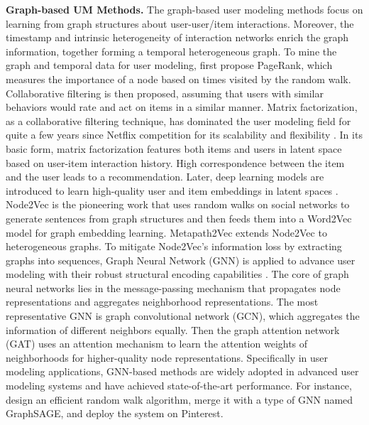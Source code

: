 \documentclass[11pt]{article}
\renewcommand\paragraph[1]{\vspace{0.05in} \noindent \textbf{#1.}}
\begin{document}
\paragraph{Graph-based UM Methods} The graph-based user modeling methods focus on learning from graph structures about user-user/item interactions. Moreover, the timestamp and intrinsic heterogeneity of interaction networks enrich the graph information, together forming a temporal heterogeneous graph. To mine the graph and temporal data for user modeling, \citet{page1998pagerank} first propose PageRank, which measures the importance of a node based on times visited by the random walk. Collaborative filtering \cite{schafer2007collaborative} is then proposed, assuming that users with similar behaviors would rate and act on items in a similar manner. Matrix factorization, as a collaborative filtering technique, has dominated the user modeling field for quite a few years since Netflix competition for its scalability and flexibility \cite{singh2008relational, koren2009matrix, lee2000algorithms}. In its basic form, matrix factorization features both items and users in latent space based on user-item interaction history. High correspondence between the item and the user leads to a recommendation. Later, deep learning models are introduced to learn high-quality user and item embeddings in latent spaces \cite{perozzi2014deepwalk,grover2016node2vec,tang2015line,dong2017metapath2vec}. Node2Vec \cite{grover2016node2vec} is the pioneering work that uses random walks on social networks to generate sentences from graph structures and then feeds them into a Word2Vec model \cite{mikolov2013efficient} for graph embedding learning. Metapath2Vec \cite{dong2017metapath2vec} extends Node2Vec to heterogeneous graphs. To mitigate Node2Vec's information loss by extracting graphs into sequences, Graph Neural Network (GNN) is applied to advance user modeling with their robust structural encoding capabilities \cite{kipf2016semi, velivckovic2018graph, hu2020heterogeneous}. The core of graph neural networks lies in the message-passing mechanism that propagates node representations and aggregates neighborhood representations. The most representative GNN is graph convolutional network (GCN), which aggregates the information of different neighbors equally. Then the graph attention network (GAT) uses an attention mechanism to learn the attention weights of neighborhoods for higher-quality node representations. 
Specifically in user modeling applications, GNN-based methods are widely adopted in advanced user modeling systems and have achieved state-of-the-art performance. For instance, \citet{ying2018pinsage} design an efficient random walk algorithm, merge it with a type of GNN named GraphSAGE, and deploy the system on Pinterest.
\end{document}
